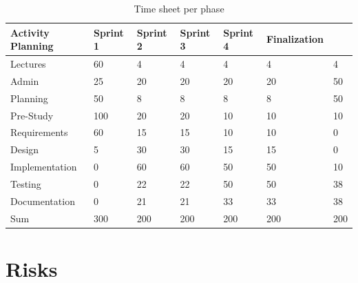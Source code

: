 \documentclass[11pt]{book}
\begin{document}
\begin{table}[H]
\centering
\begin{tabular}{ l | l l l l l l }
    Activity                Planning    & Sprint 1  & Sprint 2  & Sprint 3  & Sprint 4  & Finalization    \\ \hline        
    Lectures                & 60        & 4         & 4         & 4         & 4         & 4               \\ \hline
    Admin                   & 25        & 20        & 20        & 20        & 20        & 50              \\ \hline
    Planning                & 50        & 8         & 8         & 8         & 8         & 50              \\ \hline
    Pre-Study               & 100       & 20        & 20        & 10        & 10        & 10              \\ \hline
    Requirements            & 60        & 15        & 15        & 10        & 10        & 0               \\ \hline
    Design                  & 5         & 30        & 30        & 15        & 15        & 0               \\ \hline
    Implementation          & 0         & 60        & 60        & 50        & 50        & 10              \\ \hline
    Testing                 & 0         & 22        & 22        & 50        & 50        & 38              \\ \hline
    Documentation           & 0         & 21        & 21        & 33        & 33        & 38              \\ \hline
    Sum                     & 300       & 200       & 200       & 200       & 200       & 200
\end{tabular}
\label{tab:plan_time_per_phase}
\caption{Time sheet per phase}
\end{table}

\section{Risks}\label{sec:project_risk_assessment}
\end{document}
